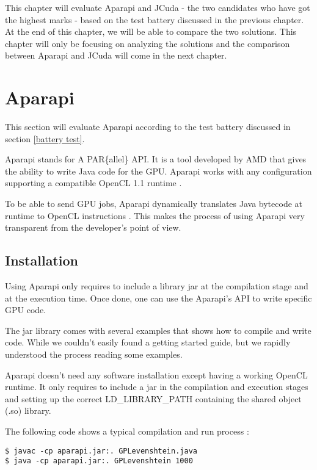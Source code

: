 This chapter will evaluate Aparapi and JCuda - the two candidates who have got the highest marks - based on the test battery discussed in the previous chapter. At the end of this chapter, we will be able to compare the two solutions. This chapter will only be focusing on analyzing the solutions and the comparison between Aparapi and JCuda will come in the next chapter.

\section{Aparapi}

This section will evaluate Aparapi according to the test battery discussed in section \ref{battery test}.

Aparapi stands for A PAR\{allel\} API. It is a tool developed by AMD that gives the ability to write Java code for the GPU. Aparapi works with any configuration supporting a compatible OpenCL 1.1 runtime \cite{aparapiquestions}.

To be able to send GPU jobs, Aparapi dynamically translates Java bytecode at runtime to OpenCL instructions \cite{aparapiblog}. This makes the process of using Aparapi very transparent from the developer's point of view.

\subsection{Installation}

Using Aparapi only requires to include a library jar at the compilation stage and at the execution time. Once done, one can use the Aparapi's API to write specific GPU code.

The jar library comes with several examples that shows how to compile and write code. While we couldn't easily found a getting started guide, but we rapidly understood the process reading some examples.

Aparapi doesn't need any software installation except having a working OpenCL runtime. It only requires to include a jar in the compilation and execution stages and setting up the correct LD\_LIBRARY\_PATH containing the shared object (.so) library.

The following code shows a typical compilation and run process :

\begin{lstlisting}
$ javac -cp aparapi.jar:. GPLevenshtein.java
$ java -cp aparapi.jar:. GPLevenshtein 1000
\end{lstlisting}

